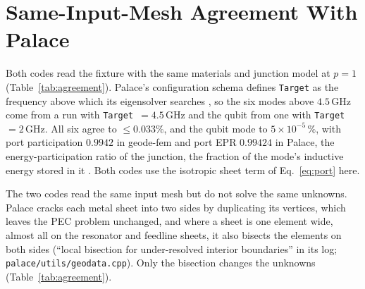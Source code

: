 \documentclass{anvil-paper}
\begin{document}
\section{Same-Input-Mesh Agreement With Palace}
\label{sec:agreement}

Both codes read the fixture with the same materials and junction model at
$p = 1$ (Table~\ref{tab:agreement}). Palace's configuration schema
defines \texttt{Target} as the frequency above which its eigensolver
searches \citep{palace}, so the six modes above $4.5$\,GHz come from a run
with \texttt{Target}~$=4.5$\,GHz and the qubit from one with
\texttt{Target}~$=2$\,GHz. All six agree to $\leq 0.033\%$, and the qubit mode to $5\times10^{-5}\,\%$, with port
participation $0.9942$ in geode-fem and port EPR $0.99424$ in Palace, the
energy-participation ratio of the junction, the fraction of the mode's
inductive energy stored in it \citep{minev2021energy}. Both codes use the
isotropic sheet term of Eq.~\eqref{eq:port} here.

The two codes read the same input mesh but do not solve the same unknowns.
Palace cracks each metal sheet into two sides by duplicating its vertices,
which leaves the PEC problem unchanged, and where a sheet is one element
wide, almost all on the resonator and feedline sheets, it also bisects the
elements on both sides (``local bisection for under-resolved interior
boundaries'' in its log; \texttt{palace/utils/geodata.cpp}). Only the
bisection changes the unknowns (Table~\ref{tab:agreement}).
\end{document}
